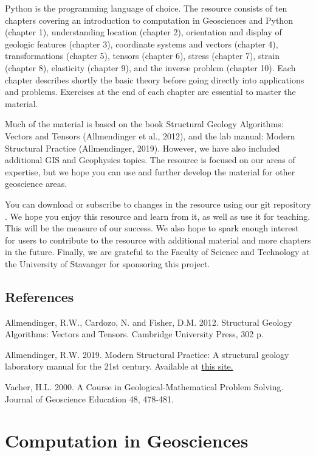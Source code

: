 \documentclass[a4paper , 12pt]{book}
\begin{document}
Python is the programming language of choice. The resource consists of ten chapters covering an introduction to computation in Geosciences and Python (chapter 1), understanding location (chapter 2), orientation and display of geologic features (chapter 3), coordinate systems and vectors (chapter 4), transformations (chapter 5), tensors (chapter 6), stress (chapter 7), strain (chapter 8), elasticity (chapter 9), and the inverse problem (chapter 10). Each chapter describes shortly the basic theory before going directly into applications and problems. Exercises at the end of each chapter are essential to master the material. 

Much of the material is based on the book Structural Geology Algorithms: Vectors and Tensors (Allmendinger et al., 2012), and the lab manual: Modern Structural Practice (Allmendinger, 2019). However, we have also included additional GIS and Geophysics topics. The resource is focused on our areas of expertise, but we hope you can use and further develop the material for other geoscience areas.

You can download or subscribe to changes in the resource using our git repository . We hope you enjoy this resource and learn from it, as well as use it for teaching. This will be the measure of our success. We also hope to spark enough interest for users to contribute to the resource with additional material and more chapters in the future. Finally, we are grateful to the Faculty of Science and Technology at the University of Stavanger for sponsoring this project.

\section*{References}
Allmendinger, R.W., Cardozo, N. and Fisher, D.M. 2012. Structural Geology Algorithms: Vectors and Tensors. Cambridge University Press, 302 p.

Allmendinger, R.W. 2019. Modern Structural Practice: A structural geology laboratory manual for the 21st century. Available at \href{http://www.geo.cornell.edu/geology/faculty/RWA/structure-lab-manual}{this site.}

Vacher, H.L. 2000. A Course in Geological-Mathematical Problem Solving. Journal of Geoscience Education 48, 478-481.

\tableofcontents

\chapter{Computation in Geosciences}
\end{document}

